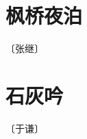 \documentclass[12pt,UTF-8,openany]{ctexbook}
\begin{document}
\vspace{8pt}


\section{枫桥夜泊}

\begin{center}
    \vspace{10pt}
    
    \begin{normalsize}
        
        〔张继〕
        
    \end{normalsize}
    
    \vspace{8pt}
    
    \begin{large}
        
        
        
    \end{large}
    
\end{center}

\vspace{8pt}


\section{石灰吟}

\begin{center}
    \vspace{10pt}
    
    \begin{normalsize}
        
        〔于谦〕
        
    \end{normalsize}
    
    \vspace{8pt}
    
    \begin{large}
        
        
        
    \end{large}
    
\end{center}
\end{document}
